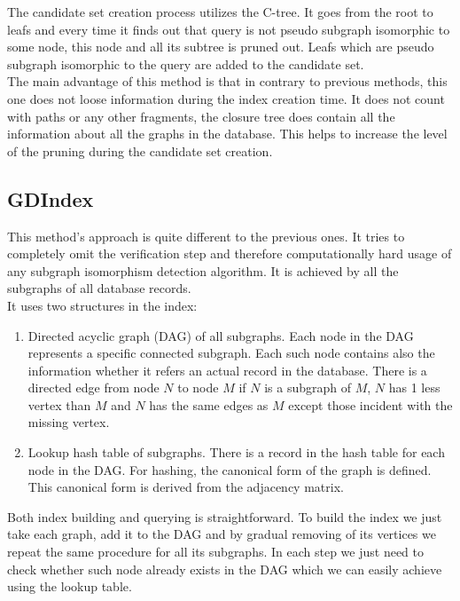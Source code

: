 The candidate set creation process utilizes the C-tree. It goes from the root to leafs and every time it finds out that query is not pseudo subgraph isomorphic to some node, this node and all its subtree is pruned out. Leafs which are pseudo subgraph isomorphic to the query are added to the candidate set.\\

The main advantage of this method is that in contrary to previous methods, this one does not loose information during the index creation time. It does not count with paths or any other fragments, the closure tree does contain all the information about all the graphs in the database. This helps to increase the level of the pruning during the candidate set creation.

\subsection{GDIndex}

This method's approach is quite different to the previous ones. It tries to completely omit the verification step and therefore computationally hard usage of any subgraph isomorphism detection algorithm. It is achieved by all the subgraphs of all database records.\\


It uses two structures in the index:

\begin{enumerate}
	\item Directed acyclic graph (DAG) of all subgraphs. Each node in the DAG represents a specific connected subgraph. Each such node contains also the information whether it refers an actual record in the database. There is a directed edge from node $ N $ to node $ M $ if $ N $ is a subgraph of $ M $, $ N $ has 1 less vertex than $ M $ and $ N $ has the same edges as $ M $ except those incident with the missing vertex.
	
	\item Lookup hash table of subgraphs. There is a record in the hash table for each node in the DAG. For hashing, the canonical form of the graph is defined. This canonical form is derived from the adjacency matrix.
\end{enumerate}

Both index building and querying is straightforward. To build the index we just take each graph, add it to the DAG and by gradual removing of its vertices we repeat the same procedure for all its subgraphs. In each step we just need to check whether such node already exists in the DAG which we can easily achieve using the lookup table.\\

